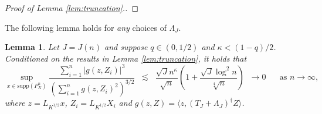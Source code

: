 \documentclass[11pt,a4paper]{article}
\renewcommand{\bar}{\overline}
\theoremstyle{definition}
\theoremstyle{plain}
\newtheorem{lemma}{Lemma}[section]
\theoremstyle{remark}
\newcommand{\supp}{\mathrm{supp}}
\newcommand{\ud}{\mathrm d}
\newcommand{\und}{\underline}
\begin{document}
\begin{proof}[Proof of Lemma \ref{lem:truncation}.]
%
%
%
\end{proof}


The following lemma holds for \emph{any} choices of $\Lambda_J$.
\begin{lemma}
Let $J=J(n)$ and suppose $q\in(0,1/2)$ and $\kappa<(1-q)/2$.
Conditioned on the results in Lemma \ref{lem:truncation}, it holds that 
$$
\sup_{x\in \supp(P_X^n)}\frac{\sum_{i=1}^n |g(z,Z_i)|^3}{(\sum_{i=1}^n g(z,Z_i)^2)^{3/2}} \;\;\lesssim \;\; \frac{\sqrt{J}n^\kappa}{\sqrt{n}}\left(1+\frac{\sqrt{J}\log^2 n}{\sqrt[4]{n}}\right) \;\; \to 0\;\;\;\;\;\;\text{as }n\to\infty,
$$
where $z=L_{K^{1/2}}x$, $Z_i=L_{K^{1/2}}X_i$ and $g(z,Z)=\langle z, (T_J+\Lambda_J)^\dagger Z\rangle$.
\label{lem:anitr-lyapnov}
\end{lemma}
\end{document}
